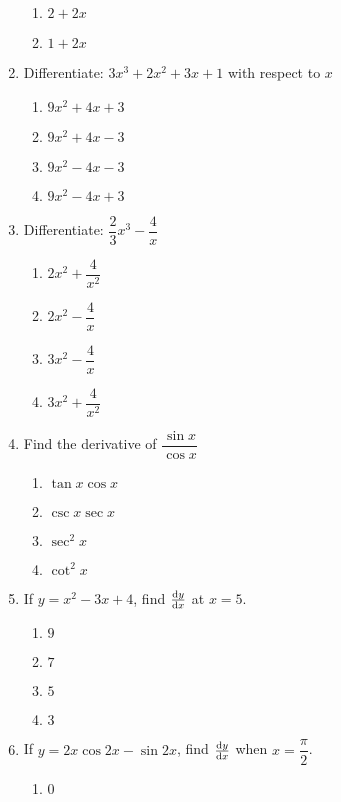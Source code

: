\begin{multicols}{2}
\begin{enumerate}[label={\arabic*.}]
\begin{enumerate}[label={\Alph*.}]
        \item \(2 + 2x\)
        \item \(1 + 2x\)
      \end{enumerate}
    \item Differentiate: \(3{x}^{3}+2{x}^{2}+3x+1\) with respect to \(x\)
      \begin{enumerate}[label={\Alph*.}]
        \item \(9{x}^{2} + 4x + 3\)
        \item \(9{x}^{2} + 4x - 3\)
        \item \(9{x}^{2} - 4x - 3\)
        \item \(9{x}^{2} - 4x + 3\)
      \end{enumerate}
    \item Differentiate: \(\dfrac{2}{3}x^{3}-\dfrac{4}{x}\)
      \begin{enumerate}[label={\Alph*.}]
        \item \(2{x}^{2} + \dfrac{4}{{x}^{2}}\)
        \item \(2x^{2}-\dfrac{4}{x}\)
        \item \(3x^{2}-\dfrac{4}{x}\)
        \item \(3x^{2}+\dfrac{4}{{x}^{2}}\)
      \end{enumerate}
    \item Find the derivative of \(\dfrac{\sin {x}}{\cos {x}}\)
      \begin{enumerate}[label={\Alph*.}]
        \item \(\tan{x}\cos{x}\)
        \item \(\csc{x}\sec{x}\)
        \item \(\sec^{2}{x}\)
        \item \(\cot^{2}{x}\)
      \end{enumerate}
    \item If \(y = {x}^{2}-3x+4\), find \(\frac{\mathrm{d}y}{\mathrm{d}x}\) at \(x=5\).
      \begin{enumerate}[label={\Alph*.}]
        \item \(9\)
        \item \(7\)
        \item \(5\)
        \item \(3\)
      \end{enumerate}
    \item If \(y = 2x\cos{2x}-\sin{2x}\), find \(\frac{\mathrm{d}y}{\mathrm{d}x}\) when \(x=\dfrac{\pi}{2}\).
      \begin{enumerate}[label={\Alph*.}]
        \item \(0\)

\end{enumerate}
\end{enumerate}
\end{multicols}
